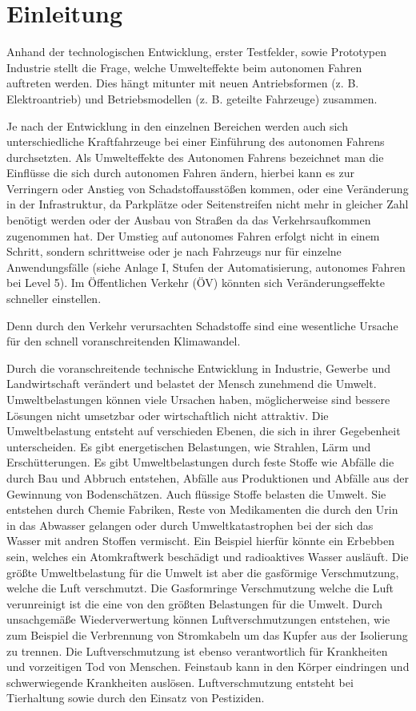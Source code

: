 \chapter{Einleitung}
Anhand der technologischen Entwicklung, erster Testfelder, sowie Prototypen Industrie stellt  die Frage,
welche Umwelteffekte beim autonomen Fahren auftreten werden.
Dies hängt mitunter mit neuen Antriebsformen (z. B. Elektroantrieb) und Betriebsmodellen (z. B. geteilte
Fahrzeuge) zusammen.

Je nach der Entwicklung in den einzelnen Bereichen werden auch sich unterschiedliche Kraftfahrzeuge bei einer Einführung des autonomen Fahrens
durchsetzten.
Als Umwelteffekte des Autonomen Fahrens bezeichnet man die Einflüsse die sich durch autonomen Fahren ändern, hierbei kann es zur Verringern oder Anstieg von Schadstoffausstößen kommen, oder eine
Veränderung in der Infrastruktur, da Parkplätze oder Seitenstreifen nicht mehr in gleicher Zahl benötigt werden oder der Ausbau von Straßen da das Verkehrsaufkommen zugenommen hat.
Der Umstieg auf autonomes Fahren erfolgt nicht in einem Schritt,
sondern schrittweise oder je nach Fahrzeugs
nur für einzelne Anwendungsfälle (siehe Anlage I, Stufen der Automatisierung, autonomes
Fahren bei Level 5). Im Öffentlichen Verkehr (ÖV) könnten sich Veränderungseffekte schneller einstellen.

Denn durch den Verkehr verursachten Schadstoffe sind eine wesentliche Ursache für den schnell voranschreitenden Klimawandel.


Durch die voranschreitende technische Entwicklung in Industrie, Gewerbe und Landwirtschaft verändert und belastet der Mensch zunehmend die Umwelt.
Umweltbelastungen können viele Ursachen haben, möglicherweise sind bessere Lösungen nicht umsetzbar oder wirtschaftlich nicht attraktiv.
Die Umweltbelastung entsteht auf verschieden Ebenen, die sich in ihrer Gegebenheit unterscheiden.
Es gibt energetischen Belastungen, wie Strahlen, Lärm und Erschütterungen.
Es gibt Umweltbelastungen durch feste Stoffe wie Abfälle die durch Bau und Abbruch entstehen, Abfälle aus Produktionen und Abfälle aus der Gewinnung von Bodenschätzen.
Auch flüssige Stoffe belasten die Umwelt. Sie entstehen durch Chemie Fabriken, Reste von Medikamenten die durch den Urin in das Abwasser gelangen oder durch Umweltkatastrophen bei der sich das Wasser mit andren Stoffen vermischt.
Ein Beispiel hierfür könnte ein Erbebben sein, welches ein Atomkraftwerk beschädigt und radioaktives Wasser ausläuft.
Die größte Umweltbelastung für die Umwelt ist aber die gasförmige Verschmutzung, welche die Luft verschmutzt.
Die Gasformringe Verschmutzung welche die Luft verunreinigt ist die eine von den größten Belastungen für die Umwelt.
Durch unsachgemäße Wiederverwertung können Luftverschmutzungen entstehen, wie zum Beispiel die Verbrennung von
Stromkabeln um das Kupfer aus der Isolierung zu trennen.
Die Luftverschmutzung ist ebenso verantwortlich für Krankheiten und vorzeitigen Tod von Menschen.
Feinstaub kann in den Körper eindringen und schwerwiegende Krankheiten auslösen.
Luftverschmutzung entsteht bei Tierhaltung sowie durch den Einsatz von Pestiziden.

